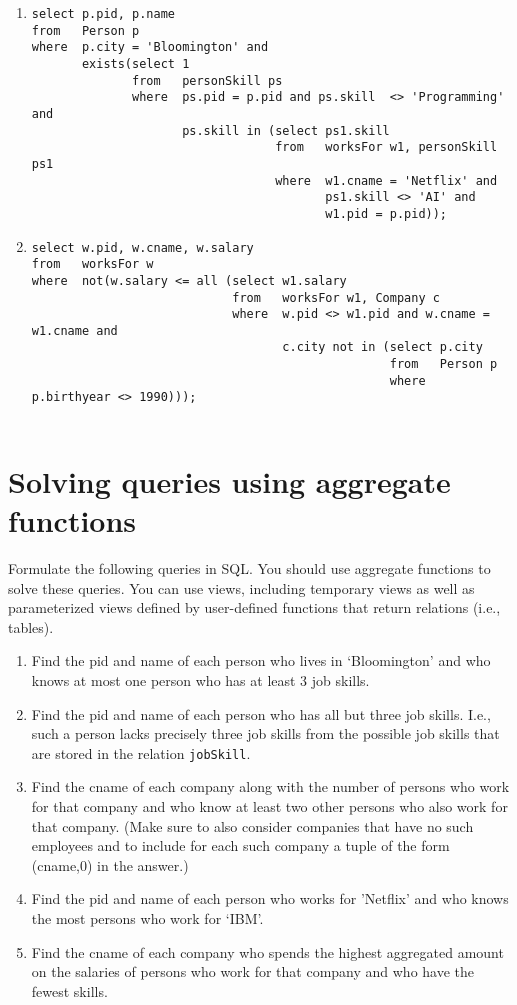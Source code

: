 \documentclass{article}
\begin{document}
\begin{enumerate}[resume]
\item  
{\small
\begin{verbatim}
select p.pid, p.name
from   Person p
where  p.city = 'Bloomington' and 
       exists(select 1
              from   personSkill ps
              where  ps.pid = p.pid and ps.skill  <> 'Programming' and
                     ps.skill in (select ps1.skill
                                  from   worksFor w1, personSkill ps1
                                  where  w1.cname = 'Netflix' and 
                                         ps1.skill <> 'AI' and 
                                         w1.pid = p.pid));
\end{verbatim}}
\item 
{\small
\begin{verbatim}
select w.pid, w.cname, w.salary
from   worksFor w
where  not(w.salary <= all (select w1.salary
                            from   worksFor w1, Company c
                            where  w.pid <> w1.pid and w.cname = w1.cname and 
                                   c.city not in (select p.city
                                                  from   Person p
                                                  where  p.birthyear <> 1990)));
                                               
\end{verbatim}
}
\end{enumerate}
\newpage
\section{Solving queries using aggregate functions}

Formulate the following queries in SQL.   You should use aggregate functions to solve these queries.  You can use views,
including temporary views as well as parameterized views defined by
user-defined functions that return relations (i.e., tables).

\begin{enumerate}[resume]
\item Find the pid and name of each person who lives in `Bloomington' and who knows at most one
person who has at least 3 job skills.
\item Find the pid and name of each person who has all but three job skills.   I.e., such a person lacks precisely three
job skills from the possible job skills that are stored in the relation {\tt jobSkill}.    
\item Find the cname of each company along with the number of persons who work for that company and
who know at least two other persons who also work for that company.
(Make sure to also consider companies that have no such employees and to include for each
such company a tuple of the form (cname,0) in the answer.)
\item  Find the pid and name of each person who works for 'Netflix' and who knows the most persons who work for `IBM'.
\item Find the cname of each company who spends the highest aggregated amount on the salaries of persons who 
work for that company and who have the fewest skills.
\end{enumerate}
\newpage
\end{document}
